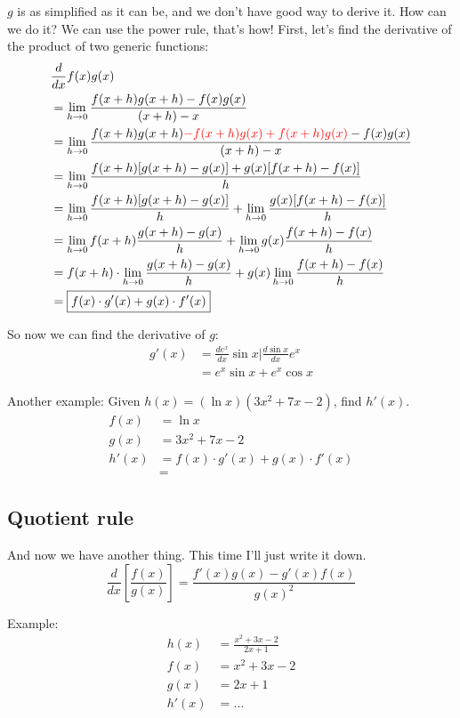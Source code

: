\documentclass[12pt, letterpaper]{article}
\begin{document}
$g$ is as simplified as it can be, and we don't have  good way to derive it. How can we do it? We can use the power rule, that's how! First, let's find the derivative of the product of two generic functions:
\begin{align*}
    & \frac{d}{dx}f(x)g(x) \\
    &= \lim_{h \to 0} \frac{f(x+h)g(x+h)-f(x)g(x)}{(x+h)-x} \\
    &= \lim_{h \to 0} \frac{f(x+h)g(x+h){\color{red}-f(x+h)g(x)+f(x+h)g(x)}-f(x)g(x)}{(x+h)-x} \\
    &= \lim_{h \to 0} \frac{f(x+h)[g(x+h)-g(x)] + g(x)[f(x+h)-f(x)]}{h} \\
    &= \lim_{h \to 0} \frac{f(x+h)[g(x+h)-g(x)]}{h} + \lim_{h \to 0} \frac{g(x)[f(x+h)-f(x)]}{h} \\
    &= \lim_{h \to 0} f(x+h)\frac{g(x+h)-g(x)}{h} + \lim_{h \to 0} g(x)\frac{f(x+h)-f(x)}{h} \\
    &= f(x+h) \cdot \lim_{h \to 0} \frac{g(x+h)-g(x)}{h}+g(x)\lim_{h \to 0}\frac{f(x+h)-f(x)}{h} \\
    &= \boxed{f(x) \cdot g'(x) + g(x) \cdot f'(x)}
\end{align*}

So now we can find the derivative of $g$:
\begin{align*}
    g'(x) &= \frac{de^x}{dx}\sin x | \frac{d\sin x}{dx}e^x \\
    &= \boxed{e^x \sin x + e^x \cos x}
\end{align*}

Another example: Given $h(x)=(\ln x)(3x^2+7x-2)$, find $h'(x)$.
\begin{align*}
    f(x) &=\ln x \\
    g(x) &= 3x^2+7x-2 \\
    h'(x) &= f(x)\cdot g'(x) + g(x) \cdot f'(x) \\
    &= 
\end{align*}

\subsection{Quotient rule}
And now we have another thing. This time I'll just write it down.
\begin{equation*}
    \frac{d}{dx}[\frac{f(x)}{g(x)}] = \frac{f'(x)g(x)-g'(x)f(x)}{g(x)^2}
\end{equation*}

Example:
\begin{align*}
    h(x) &= \frac{x^2+3x-2}{2x+1} \\
    f(x) &= x^2+3x-2 \\
    g(x) &= 2x+1 \\
    h'(x) &= \hdots
\end{align*}
\end{document}
